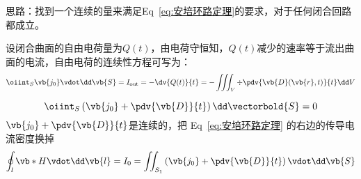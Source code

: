 \begin{remark}
	思路：找到一个连续的量来满足Eq~\eqref{eq:安培环路定理}的要求，对于任何闭合回路都成立。
\end{remark}

设闭合曲面的自由电荷量为$Q(t)$，由电荷守恒知，$Q(t)$减少的速率等于流出曲面的电流，自由电荷的连续性方程可写为：
\begin{equation}
	\oiint_{S}  \vb{j_0} \vdot \dd \vb{S} = I_{\text{out}} = - \dv{Q(t)}{t} = - \iiint_V \div \pdv{\vb{D}(\vb{r},t)}{t} \dd V
\end{equation}

\begin{equation}
	\oiint_S \left( \vb{j_0} + \pdv{\vb{D}}{t} \right) \dd \vectorbold{S} = 0
\end{equation}
$\vb{j_0} + \pdv{\vb{D}}{t}$是连续的，把 Eq~\eqref{eq:安培环路定理} 的右边的传导电流密度换掉
\begin{equation}
	\oint_l \vb*{H} \vdot \dd \vb{l} = I_0 = \iint_{S_1} \left(\vb{j_0} + \pdv{\vb{D}}{t}\right) \vdot \dd \vb{S}
\end{equation}
